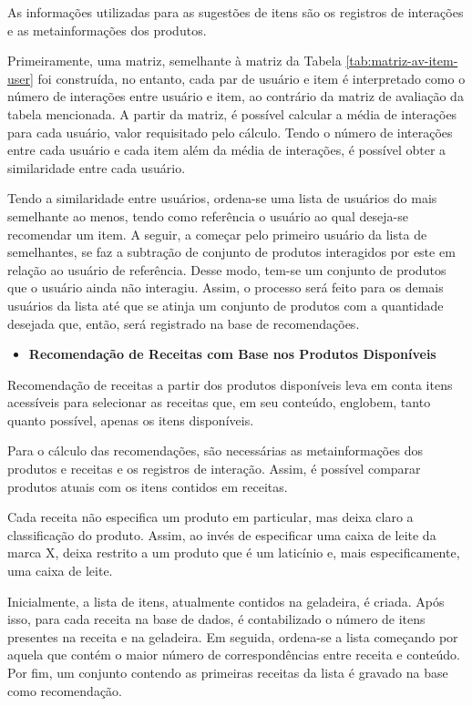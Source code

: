 As informações utilizadas para as sugestões de itens são os registros de interações e as metainformações dos produtos. 

Primeiramente, uma matriz, semelhante à matriz da Tabela \ref{tab:matriz-av-item-user} foi construída, no entanto, cada par de usuário e item é interpretado como o número de interações entre usuário e item, ao contrário da matriz de avaliação da tabela mencionada. A partir da matriz, é possível calcular a média de interações para cada usuário, valor requisitado pelo cálculo. Tendo o número de interações entre cada usuário e cada item além da média de interações, é possível obter a similaridade entre cada usuário.

Tendo a similaridade entre usuários, ordena-se uma lista de usuários do mais semelhante ao menos, tendo como referência o usuário ao qual deseja-se recomendar um item. A seguir, a começar pelo primeiro usuário da lista de semelhantes, se faz a subtração de conjunto de produtos interagidos por este em relação ao usuário de referência. Desse modo, tem-se um conjunto de produtos que o usuário ainda não interagiu. Assim, o processo será feito para os demais usuários da lista até que se atinja um conjunto de produtos com a quantidade desejada que, então, será registrado na base de recomendações.

\begin{itemize}
    \item \textbf{Recomendação de Receitas com Base nos Produtos Disponíveis}
\end{itemize}

Recomendação de receitas a partir dos produtos disponíveis leva em conta itens acessíveis para selecionar as receitas que, em seu conteúdo, englobem, tanto quanto possível, apenas os itens disponíveis.

Para o cálculo das recomendações, são necessárias as metainformações dos produtos e receitas e os registros de interação. Assim, é possível comparar produtos atuais com os itens contidos em receitas.

Cada receita não especifica um produto em particular, mas deixa claro a classificação do produto. Assim, ao invés de especificar uma caixa de leite da marca X, deixa restrito a um produto que é um laticínio e, mais especificamente, uma caixa de leite.

Inicialmente, a lista de itens, atualmente contidos na geladeira, é criada. Após isso, para cada receita na base de dados, é contabilizado o número de itens presentes na receita e na geladeira. Em seguida, ordena-se a lista começando por aquela que contém o maior número de correspondências entre receita e conteúdo. Por fim, um conjunto contendo as primeiras receitas da lista é gravado na base como recomendação.

